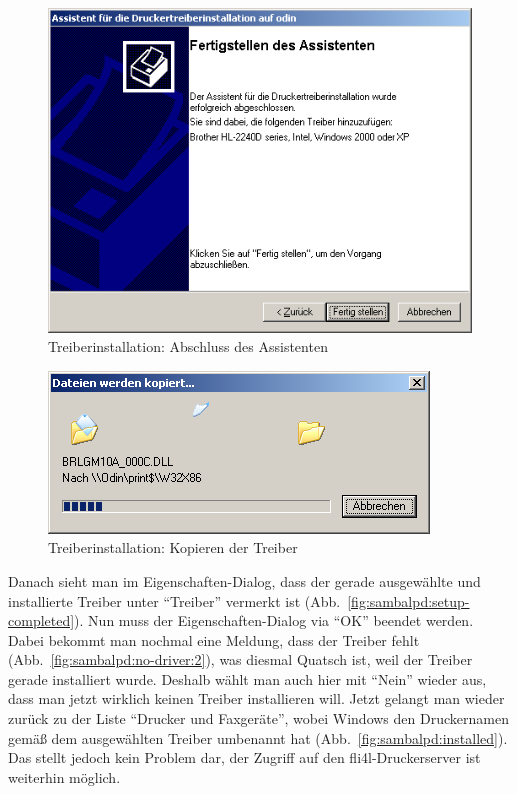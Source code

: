 \begin{figure}[hbt!]
\centering
\includegraphics[width=\columnwidth]{image013}
\caption{Treiberinstallation: Abschluss des Assistenten}
\label{fig:sambalpd:setup-end}
\end{figure}

\begin{figure}[hbt!]
\centering
\includegraphics[width=\columnwidth]{image014}
\caption{Treiberinstallation: Kopieren der Treiber}
\label{fig:sambalpd:driver-copy}
\end{figure}

Danach sieht man im Eigenschaften-Dialog, dass der gerade ausgewählte und
installierte Treiber unter ``Treiber'' vermerkt ist
(Abb.~\ref{fig:sambalpd:setup-completed}). Nun muss der Eigenschaften-Dialog
via ``OK'' beendet werden. Dabei bekommt man nochmal eine Meldung, dass der
Treiber fehlt (Abb.~\ref{fig:sambalpd:no-driver:2}), was diesmal Quatsch ist,
weil der Treiber gerade installiert wurde. Deshalb wählt man auch hier mit
``Nein'' wieder aus, dass man jetzt wirklich keinen Treiber installieren will.
Jetzt gelangt man wieder zurück zu der Liste ``Drucker und Faxgeräte'', wobei
Windows den Druckernamen gemäß dem ausgewählten Treiber umbenannt hat
(Abb.~\ref{fig:sambalpd:installed}). Das stellt jedoch kein Problem dar, der
Zugriff auf den fli4l-Druckerserver ist weiterhin möglich.

